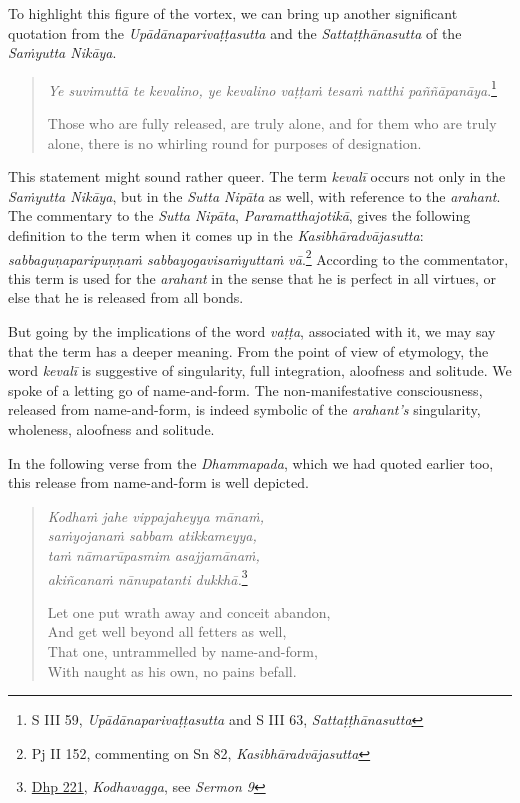 To highlight this figure of the vortex, we can bring up another significant quotation from the \emph{Upādānaparivaṭṭasutta} and the \emph{Sattaṭṭhānasutta} of the \emph{Saṁyutta Nikāya}.

\begin{quote}
\emph{Ye suvimuttā te kevalino, ye kevalino vaṭṭaṁ tesaṁ natthi paññāpanāya}.\footnote{S III 59, \emph{Upādānaparivaṭṭasutta} and S III 63, \emph{Sattaṭṭhānasutta}}

Those who are fully released, are truly alone, and for them who are truly alone, there is no whirling round for purposes of designation.
\end{quote}

This statement might sound rather queer. The term \emph{kevalī} occurs not only in the \emph{Saṁyutta Nikāya}, but in the \emph{Sutta Nipāta} as well, with reference to the \emph{arahant}. The commentary to the \emph{Sutta Nipāta}, \emph{Paramatthajotikā}, gives the following definition to the term when it comes up in the \emph{Kasibhāradvājasutta}: \emph{sabbaguṇaparipuṇṇaṁ sabbayogavisaṁyuttaṁ vā}.\footnote{Pj II 152, commenting on Sn 82, \emph{Kasibhāradvājasutta}} According to the commentator, this term is used for the \emph{arahant} in the sense that he is perfect in all virtues, or else that he is released from all bonds.

But going by the implications of the word \emph{vaṭṭa}, associated with it, we may say that the term has a deeper meaning. From the point of view of etymology, the word \emph{kevalī} is suggestive of singularity, full integration, aloofness and solitude. We spoke of a letting go of name-and-form. The non-manifestative consciousness, released from name-and-form, is indeed symbolic of the \emph{arahant's} singularity, wholeness, aloofness and solitude.

In the following verse from the \emph{Dhammapada}, which we had quoted earlier too, this release from name-and-form is well depicted.

\begin{quote}
\emph{Kodhaṁ jahe vippajaheyya mānaṁ,}\\
\emph{saṁyojanaṁ sabbam atikkameyya,}\\
\emph{taṁ nāmarūpasmim asajjamānaṁ,}\\
\emph{akiñcanaṁ nānupatanti dukkhā.}\footnote{\href{https://suttacentral.net/dhp221-234/pli/ms}{Dhp 221}, \emph{Kodhavagga}, see \emph{Sermon 9}}

Let one put wrath away and conceit abandon,\\
And get well beyond all fetters as well,\\
That one, untrammelled by name-and-form,\\
With naught as his own, no pains befall.
\end{quote}

